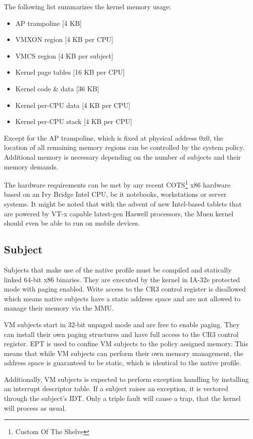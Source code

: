 The following list summarizes the kernel memory usage:

\begin{itemize}
	\item AP trampoline [4 KB]
	\item VMXON region [4 KB per CPU]
	\item VMCS region [4 KB per subject]
	\item Kernel page tables [16 KB per CPU]
	\item Kernel code \& data [36 KB]
	\item Kernel per-CPU data  [4 KB per CPU]
	\item Kernel per-CPU stack [4 KB per CPU]
\end{itemize}

Except for the AP trampoline, which is fixed at physical address 0x0, the
location of all remaining memory regions can be controlled by the system policy.
Additional memory is necessary depending on the number of subjects and their
memory demands.

The hardware requirements can be met by any recent COTS\footnote{Custom Of The
Shelve} x86 hardware based on an Ivy Bridge Intel CPU, be it notebooks,
workstations or server systems. It might be noted that with the advent of new
Intel-based tablets that are powered by VT-x capable latest-gen Haswell
processors, the Muen kernel should even be able to run on mobile devices.

\subsection{Subject}
Subjects that make use of the native profile must be compiled and statically
linked 64-bit x86 binaries. They are executed by the kernel in IA-32e protected
mode with paging enabled. Write access to the CR3 control register is disallowed
which means native subjects have a static address space and are not allowed to
manage their memory via the MMU.

VM subjects start in 32-bit unpaged mode and are free to enable paging. They can
install their own paging structures and have full access to the CR3 control
register. EPT is used to confine VM subjects to the policy assigned memory. This
means that while VM subjects can perform their own memory management, the
address space is guaranteed to be static, which is identical to the native
profile.

Additionally, VM subjects is expected to perform exception handling by
installing an interrupt descriptor table. If a subject raises an exception, it
is vectored through the subject's IDT. Only a triple fault will cause a trap,
that the kernel will process as usual.

